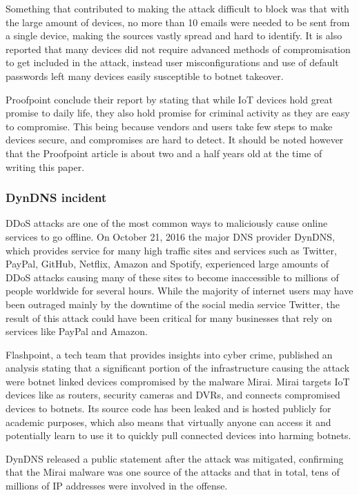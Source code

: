 \documentclass[a4paper, conference]{IEEEtran/IEEEtran}
\begin{document}
Something that contributed to making the attack difficult to block was that with the large amount of devices, no more than 10 emails were needed to be sent from a single device, making the sources vastly spread and hard to identify.\cite{proofpoint} It is also reported that many devices did not require advanced methods of compromisation to get included in the attack, instead user misconfigurations and use of default passwords left many devices easily susceptible to botnet takeover. 

Proofpoint conclude their report by stating that while IoT devices hold great promise to daily life, they also hold promise for criminal activity as they are easy to compromise. This being because vendors and users take few steps to make devices secure, and compromises are hard to detect.\cite{proofpoint} It should be noted however that the Proofpoint article is about two and a half years old at the time of writing this paper.

\subsubsection{DynDNS incident}
DDoS attacks are one of the most common ways to maliciously cause online services to go offline. On October 21, 2016 the major DNS provider DynDNS, which provides service for many high traffic sites and services such as Twitter, PayPal, GitHub, Netflix, Amazon and Spotify, experienced large amounts of DDoS attacks causing many of these sites to become inaccessible to millions of people worldwide for several hours.\cite{dynstatement} While the majority of internet users may have been outraged mainly by the downtime of the social media service Twitter, the result of this attack could have been critical for many businesses that rely on services like PayPal and Amazon.

Flashpoint, a tech team that provides insights into cyber crime,\cite{flashpoint} published an analysis stating that a significant portion of the infrastructure causing the attack were botnet linked devices compromised by the malware Mirai.\cite{fpmirai} Mirai targets IoT devices like as routers, security cameras and DVRs, and connects compromised devices to botnets. Its source code has been leaked and is hosted publicly for academic purposes, which also means that virtually anyone can access it and potentially learn to use it to quickly pull connected devices into harming botnets.

DynDNS released a public statement after the attack was mitigated, confirming that the Mirai malware was one source of the attacks and that in total, tens of millions of IP addresses were involved in the offense.\cite{dynstatement}
\end{document}
